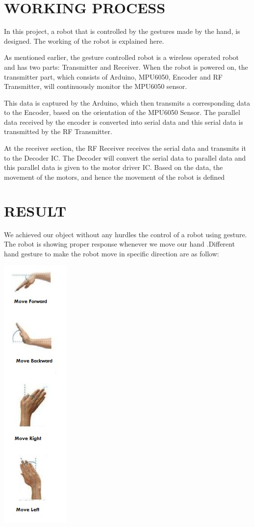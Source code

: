 \documentclass[12pt]{article}
\begin{document}
\pagebreak

\section{WORKING PROCESS}
In this project, a robot that is controlled by the gestures made by the hand, is designed. The working of the robot is explained here.\newline

As mentioned earlier, the gesture controlled robot is a wireless operated robot and has two parts: Transmitter and Receiver. When the robot is powered on, the transmitter part, which consists of Arduino, MPU6050, Encoder and RF Transmitter, will continuously monitor the MPU6050 sensor.\newline

This data is captured by the Arduino, which then transmits a corresponding data to the Encoder, based on the orientation of the MPU6050 Sensor. The parallel data received by the encoder is converted into serial data and this serial data is transmitted by the RF Transmitter.\newline

At the receiver section, the RF Receiver receives the serial data and transmits it to the Decoder IC. The Decoder will convert the serial data to parallel data and this parallel data is given to the motor driver IC. Based on the data, the movement of the motors, and hence the movement of the robot is defined
\pagebreak


\section{RESULT}
We achieved our object without any hurdles the control of a robot using gesture. The robot is showing proper response whenever we move our hand .Different hand gesture to make the robot move in specific direction are as follow:

\includegraphics[scale=1.2]{move1.png}
\end{document}
